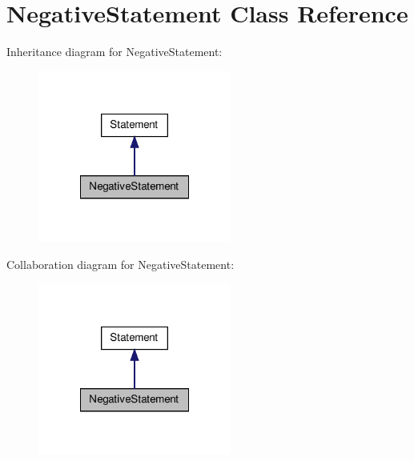 \hypertarget{class_negative_statement}{\section{Negative\-Statement Class Reference}
\label{class_negative_statement}
}


Inheritance diagram for Negative\-Statement\-:
\nopagebreak
\begin{figure}[H]
\begin{center}
\leavevmode
\includegraphics[width=180pt]{class_negative_statement__inherit__graph}
\end{center}
\end{figure}


Collaboration diagram for Negative\-Statement\-:
\nopagebreak
\begin{figure}[H]
\begin{center}
\leavevmode
\includegraphics[width=180pt]{class_negative_statement__coll__graph}
\end{center}
\end{figure}
